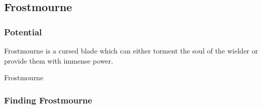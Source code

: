 \subsection{Frostmourne}



\subsubsection{Potential}

Frostmourne is a cursed blade which can either torment the soul of the wielder or provide them with immense power.

\begin{commentbox}{Frostmourne}
	
\end{commentbox}

\subsubsection{Finding Frostmourne}
